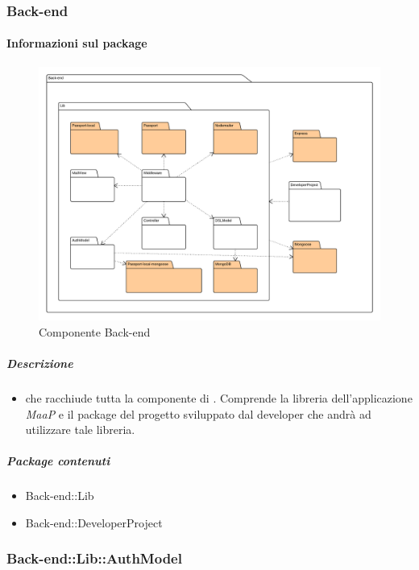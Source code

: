 
  \subsubsection{Back-end}
  \paragraph{Informazioni sul package} 
    \begin{figure}[H] 
      \begin{center} 
        \includegraphics[width=\textwidth]{packages/Back-end.png}  
        \caption{Componente Back-end}
      \end{center}  
    \end{figure} 
  \subparagraph{Descrizione} 
    \begin{itemize}
    \item[]  che racchiude tutta la componente di . Comprende la libreria dell'applicazione \textit{MaaP} e il package del progetto sviluppato dal developer che andrà ad utilizzare tale libreria.
    \end{itemize} 
    \subparagraph{Package contenuti} 
    \begin{itemize}
        \item Back-end::Lib
        \item Back-end::DeveloperProject
    \end{itemize}
  \subsubsection{Back-end::Lib::AuthModel}
